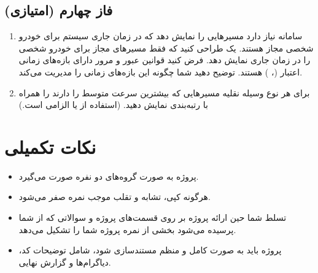 \documentclass[12pt,a4paper]{article}
\begin{document}
\subsection{فاز چهارم (امتیازی)}
\begin{enumerate}
\item[سوال ۱:] سامانه نیاز دارد مسیرهایی را نمایش دهد که در زمان جاری سیستم برای خودرو شخصی مجاز هستند. یک  طراحی کنید که فقط مسیرهای مجاز برای خودرو شخصی را در زمان جاری نمایش دهد. فرض کنید قوانین عبور و مرور دارای بازه‌های زمانی اعتبار (، ) هستند. توضیح دهید  شما چگونه این بازه‌های زمانی را مدیریت می‌کند.
\item[سوال ۲:] برای هر نوع وسیله نقلیه مسیرهایی که بیشترین سرعت متوسط را دارند را همراه با رتبه‌بندی نمایش دهید. (استفاده از  یا  الزامی است.)
\end{enumerate}

\section{نکات تکمیلی}
\begin{itemize}
\item پروژه به صورت گروه‌های دو نفره صورت می‌گیرد.
\item هرگونه کپی، تشابه و تقلب موجب نمره صفر می‌شود.
\item تسلط شما حین ارائه پروژه بر روی قسمت‌های پروژه و سوالاتی که از شما پرسیده می‌شود بخشی از نمره پروژه شما را تشکیل می‌دهد.
\item پروژه باید به صورت کامل و منظم مستندسازی شود، شامل توضیحات کد، دیاگرام‌ها و گزارش نهایی.
\end{itemize}
\end{document}
